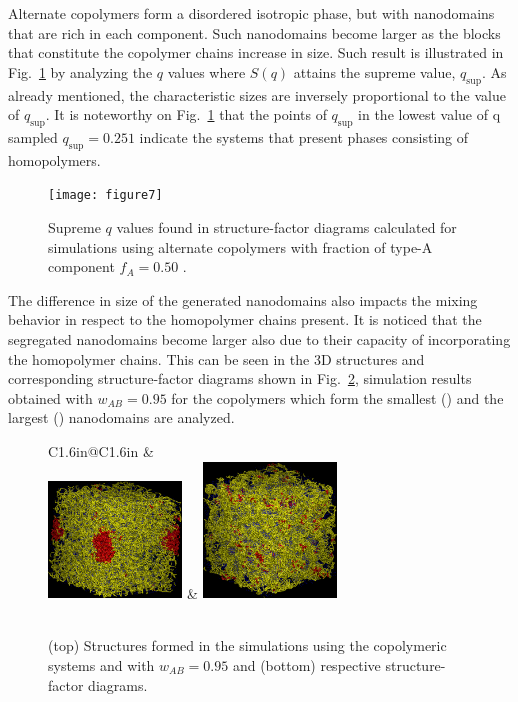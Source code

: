 \documentclass[
aip,
jcp,
reprint,
]{revtex4-1}
\begin{document}
Alternate copolymers form a disordered isotropic phase, but with nanodomains that are rich in each component.
Such nanodomains become larger as the blocks that constitute the copolymer chains increase in size.
Such result is illustrated in Fig.~\ref{fig:Figure_7} by analyzing the $q$ values where $S(q)$ attains the supreme value, $q_\mathrm{sup}$.
As already mentioned, the characteristic sizes are inversely proportional to the value of $q_\mathrm{sup}$.
It is noteworthy on Fig.~\ref{fig:Figure_7} that the points of $q_\mathrm{sup}$ in the lowest value of q sampled $q_\mathrm{sup} = 0.251$ indicate the systems that present phases consisting of homopolymers.

\begin{figure}
	\centering
	\texttt{[image: figure7]}
	\caption{Supreme $q$ values found in structure-factor diagrams calculated for simulations using alternate copolymers with fraction of type-A component $f_A=0.50$ .}
	\label{fig:Figure_7}
\end{figure}

The difference in size of the generated nanodomains also impacts the mixing behavior in respect to the homopolymer chains present.
It is noticed that the segregated nanodomains become larger also due to their capacity of incorporating the homopolymer chains.
This can be seen in the 3D structures and corresponding structure-factor diagrams shown in Fig.~\ref{fig:Figure_8}, simulation results obtained with $w_{AB}=0.95$ for the copolymers which form the smallest () and the largest () nanodomains are analyzed.

\begin{figure}
	\centering
	\begin{tabular}{C{1.6in}@{}C{1.6in}}
		 \textcolor{white}{ } & \textcolor{white}{ } \\
		 \includegraphics[width=1.4in]{alt1_095} & \includegraphics[width=1.4in]{A3B2A2B3_095} \\
		 \\
	\end{tabular}
	\caption{(top) Structures formed in the simulations using the copolymeric systems  and  with $w_{AB}=0.95$ and (bottom) respective structure-factor diagrams.}
	\label{fig:Figure_8}
\end{figure}
\end{document}
